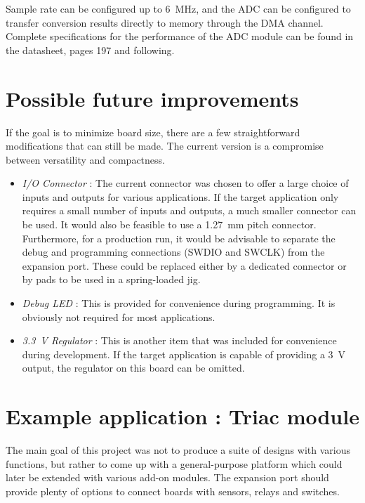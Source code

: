 Sample rate can be configured up to \SI{6}{MHz}, and the ADC can be configured
to transfer conversion results directly to memory through the \ac{DMA} channel.
Complete specifications for the performance of the ADC module can be found in
the datasheet, pages 197 and following.

\section{Possible future improvements}

If the goal is to minimize board size, there are a few straightforward
modifications that can still be made. The current version is a compromise
between versatility and compactness.

\begin{itemize}
  \item \emph{I/O Connector} : The current connector was chosen to offer a large
    choice of inputs and outputs for various applications. If the target
    application only requires a small number of inputs and outputs, a much
    smaller connector can be used. It would also be feasible to use
    a \SI{1.27}{mm} pitch connector. 
    Furthermore, for a production run, it would be advisable to separate the
    debug and programming connections (SWDIO and SWCLK) from the expansion port.
    These could be replaced either by a dedicated connector or by pads to be
    used in a spring-loaded jig.
  \item \emph{Debug LED} : This is provided for convenience during programming.
    It is obviously not required for most applications. 
  \item \emph{\SI{3.3}{V} Regulator} : This is another item that was included
    for convenience during development. If the target application is capable of
    providing a \SI{3}{V} output, the regulator on this board can be omitted.
\end{itemize}

\section{Example application : Triac module}

The main goal of this project was not to produce a suite of designs with various
functions, but rather to come up with a general-purpose platform which could
later be extended with various add-on modules. The expansion port should provide
plenty of options to connect boards with sensors, relays and switches.

